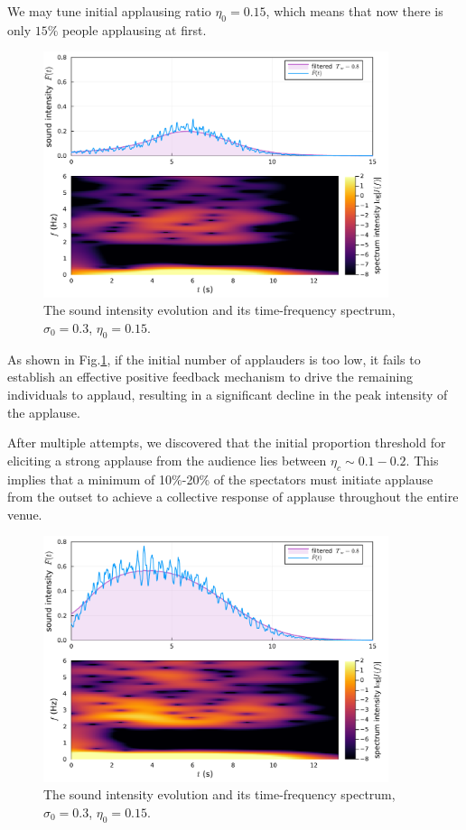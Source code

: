 \documentclass[UTF8,a4paper,11pt]{ctexart}
\begin{document}
We may tune initial applausing ratio $η_0=0.15$, which means that now there is only $15\%$ people applausing at first.

\begin{figure}[H]
    \centering
    \includegraphics[width=0.9\textwidth]{eta01.pdf}
    \caption{The sound intensity evolution and its time-frequency spectrum, $σ_0 = 0.3$, $η_0=0.15$.}
    \label{fig:etalow}
\end{figure}

As shown in Fig.\ref{fig:etalow}, if the initial number of applauders is too low, it fails to establish an effective positive feedback mechanism to drive the remaining individuals to applaud, resulting in a significant decline in the peak intensity of the applause.

After multiple attempts, we discovered that the initial proportion threshold for eliciting a strong applause from the audience lies between $η_c\sim 0.1-0.2$. This implies that a minimum of 10\%-20\% of the spectators must initiate applause from the outset to achieve a collective response of applause throughout the entire venue.

\begin{figure}[H]
    \centering
    \includegraphics[width=0.9\textwidth]{eta08.pdf}
    \caption{The sound intensity evolution and its time-frequency spectrum, $σ_0 = 0.3$, $η_0=0.15$.}
    \label{fig:etahigh}
\end{figure}
\end{document}
